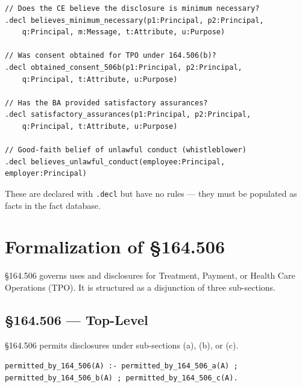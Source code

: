 \documentclass[11pt,letterpaper]{article}
\begin{document}
\begin{lstlisting}[style=soufflestyle,caption={Oracle predicates from hipaa\_macros.dl}]
// Does the CE believe the disclosure is minimum necessary?
.decl believes_minimum_necessary(p1:Principal, p2:Principal,
    q:Principal, m:Message, t:Attribute, u:Purpose)

// Was consent obtained for TPO under 164.506(b)?
.decl obtained_consent_506b(p1:Principal, p2:Principal,
    q:Principal, t:Attribute, u:Purpose)

// Has the BA provided satisfactory assurances?
.decl satisfactory_assurances(p1:Principal, p2:Principal,
    q:Principal, t:Attribute, u:Purpose)

// Good-faith belief of unlawful conduct (whistleblower)
.decl believes_unlawful_conduct(employee:Principal, employer:Principal)
\end{lstlisting}

These are declared with \texttt{.decl} but have no rules --- they must be populated as facts in the fact database.


\section{Formalization of \S 164.506}
\label{sec:506}

\S 164.506 governs uses and disclosures for Treatment, Payment, or Health Care Operations (TPO). It is structured as a disjunction of three sub-sections.

\subsection{\S 164.506 --- Top-Level}

\begin{hipaabox}
\S 164.506 permits disclosures under sub-sections (a), (b), or (c).
\end{hipaabox}

\begin{pdfbox}
\texttt{permitted\_by\_164\_506(A) :- permitted\_by\_164\_506\_a(A) ;}\\
\texttt{\hspace{2em}permitted\_by\_164\_506\_b(A) ; permitted\_by\_164\_506\_c(A).}
\end{pdfbox}
\end{document}
